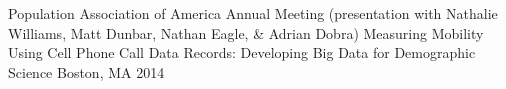 \begin{cventries}


  \cventry
    {Population Association of America Annual Meeting (presentation with Nathalie Williams, Matt Dunbar, Nathan Eagle, \& Adrian Dobra)} %
    {Measuring Mobility Using Cell Phone Call Data Records: Developing Big Data for Demographic Science} %
    {Boston, MA} %
    {2014} %
    {}





\end{cventries}
